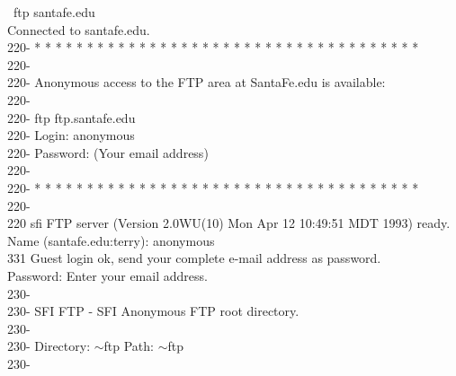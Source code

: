 \vspace{0.5in}
\noindent
\begin{sl}
\prompt\ {\sf ftp santafe.edu}                                                  \\
Connected to santafe.edu.                                                       \\
220-  * * * * * * * * * * * * * * * * * * * * * * * * * * * * * * * * * * * * * \\
220-                                                                            \\
220-   Anonymous access to the FTP area at SantaFe.edu is available:            \\
220-                                                                            \\
220-   ftp ftp.santafe.edu                                                      \\
220-   Login: anonymous                                                         \\
220-   Password: (Your email address)                                           \\
220-                                                                            \\
220-  * * * * * * * * * * * * * * * * * * * * * * * * * * * * * * * * * * * * * \\
220-                                                                            \\
220 sfi FTP server (Version 2.0WU(10) Mon Apr 12 10:49:51 MDT 1993) ready.      \\
Name (santafe.edu:terry): {\sf anonymous}                                       \\
331 Guest login ok, send your complete e-mail address as password.              \\
Password: {\sf Enter your email address.}                                       \\
230-                                                                            \\
230-  SFI FTP - SFI Anonymous FTP root directory.                               \\
230-                                                                            \\
230-  Directory: $\sim$ftp           Path: $\sim$ftp                            \\
230-                                                                            \\

\end{sl}

